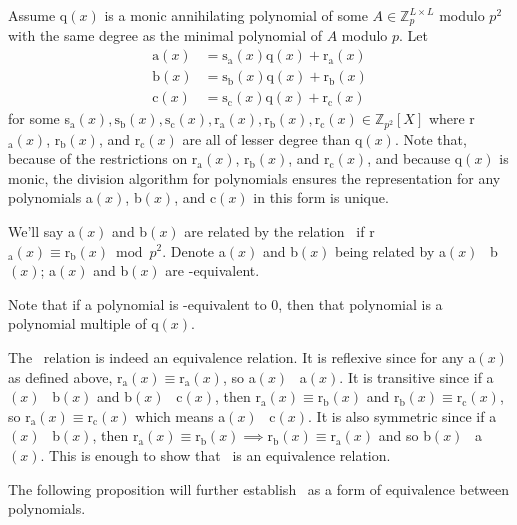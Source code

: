 \documentclass[a4paper, 12pt, reqno]{amsart}
\begin{document}
		Assume q$(x)$ is a monic annihilating polynomial of some $A \in \mathds{Z}_{p}^{L \times L}$ modulo $p^2$ with the same degree as the minimal polynomial of $A$ 
		modulo $p$. Let 
		\begin{align*}
			\text{a}(x) &= \text{s}_\text{a}(x)\text{q}(x) + \text{r}_\text{a}(x) \\
			\text{b}(x) &= \text{s}_\text{b}(x)\text{q}(x) + \text{r}_\text{b}(x) \\
			\text{c}(x) &= \text{s}_\text{c}(x)\text{q}(x) + \text{r}_\text{c}(x)
		\end{align*}
		for some 
		s$_\text{a}(x), \text{s}_\text{b}(x), \text{s}_\text{c}(x), \text{r}_\text{a}(x), \text{r}_\text{b}(x), \text{r}_\text{c}(x) \in \mathds{Z}_{p^2}[X]$ where
		r$_\text{a}(x)$, r$_\text{b}(x)$, and r$_\text{c}(x)$ are all of lesser degree than q$(x)$. Note that, because of the restrictions on r$_\text{a}(x)$, 
		r$_\text{b}(x)$, and r$_\text{c}(x)$, and because q$(x)$ is monic, the division algorithm for polynomials ensures the representation for any polynomials 
		a$(x)$, b$(x)$, and c$(x)$ in this form is unique.
		
		We'll say a$(x)$ and b$(x)$ are related by the relation \Taurus\ if r$_\text{a}(x) \equiv \text{r}_\text{b}(x) \bmod{p^2}$. Denote a$(x)$ and b$(x)$ being related 
		by a$(x)$ \Taurus\ b$(x)$; a$(x)$ and b$(x)$ are \Taurus-equivalent.
		
		Note that if a polynomial is \Taurus-equivalent to 0, then that polynomial is a polynomial multiple of q$(x)$.
		
		The \Taurus\ relation is indeed an equivalence relation. It is reflexive since for any a$(x)$ as defined above, r$_\text{a}(x) \equiv \text{r}_\text{a}(x)$, so
		a$(x)$ \Taurus\ a$(x)$. It is transitive since if a$(x)$ \Taurus\ b$(x)$ and b$(x)$ \Taurus\ c$(x)$, then $\text{r}_\text{a}(x) \equiv \text{r}_\text{b}(x)$ 
		and $\text{r}_\text{b}(x) \equiv \text{r}_\text{c}(x)$, so $\text{r}_\text{a}(x) \equiv \text{r}_\text{c}(x)$ which means a$(x)$ \Taurus\ c$(x)$. It is also
		symmetric since if a$(x)$ \Taurus\ b$(x)$, then $\text{r}_\text{a}(x) \equiv \text{r}_\text{b}(x) \implies \text{r}_\text{b}(x) \equiv \text{r}_\text{a}(x)$ and
		so b$(x)$ \Taurus\, a$(x)$. This is enough to show that \Taurus\ is an equivalence relation.
		
		The following proposition will further establish \Taurus\ as a form of equivalence between polynomials.
		
\end{document}
